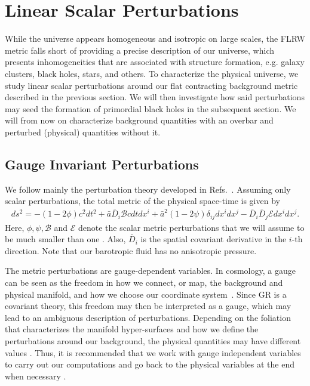 \documentclass[a4paper,11pt]{article}
\begin{document}

\section{Linear Scalar Perturbations}
\label{linearpert}
While the universe appears homogeneous and isotropic on large scales, the FLRW metric falls short of providing a precise description of our universe, which presents inhomogeneities that are associated with structure formation, e.g. galaxy clusters, black holes, stars, and others. To characterize the physical universe, we study linear scalar perturbations around our flat contracting background metric described in the previous section. We will then investigate how said perturbations may seed the formation of primordial black holes in the subsequent section. We will from now on characterize background quantities with an overbar and perturbed (physical) quantities without it.

\subsection{Gauge Invariant Perturbations}
We follow mainly the perturbation theory developed in Refs.~\cite{covariant_bardeen, Vitenti2012}. Assuming only scalar perturbations, the total metric of the physical space-time is given by
\begin{align}
\label{physmetric}
    ds^2 = -(1- 2 \phi)c^2dt^2 + \bar{a}\bar{D}_i \mathcal{B} cdt dx^i + \bar{a}^2(1-2 \psi)\delta_{ij}dx^i dx^j - \bar{D}_i\bar{D}_j \mathcal{E} dx^i dx^j 
.\end{align}
Here, $\phi, \psi, \mathcal{B}$ and $\mathcal{E}$ denote the scalar metric perturbations that we will assume to be much smaller than one \cite{vitenti2012large}. Also, $\bar{D}_i$ is the spatial covariant derivative in the $i$-th direction. Note that our barotropic fluid has no anisotropic pressure. 

The metric perturbations are gauge-dependent variables. In cosmology, a gauge can be seen as the freedom in how we connect, or map, the background and physical manifold, and how we choose our coordinate system~\cite{vitenti2012large}. Since GR is a covariant theory, this freedom may then be interpreted as a gauge, which may lead to an ambiguous description of perturbations. Depending on the foliation that characterizes the manifold hyper-surfaces and how we define the perturbations around our background, the physical quantities may have different values \cite{covariant_bardeen}.
Thus, it is recommended that we work with gauge independent variables to carry out our computations and go back to the physical variables at the end when necessary \cite{mukhanov2005physical}. 
\end{document}
